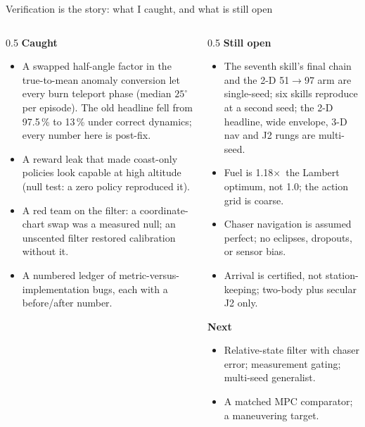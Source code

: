 \documentclass[aspectratio=169,11pt]{beamer}
\newcommand{\lambertRatio}{1.18\(\times\)}
\begin{document}
\begin{frame}{Verification is the story: what I caught, and what is still open}
\begin{columns}[T]
\begin{column}{0.5\textwidth}\footnotesize
\textbf{Caught}
\begin{itemize}
  \item A swapped half-angle factor in the true-to-mean anomaly conversion let every burn teleport phase (median $25^\circ$ per episode). The old headline fell from 97.5\,\% to 13\,\% under correct dynamics; every number here is post-fix.
  \item A reward leak that made coast-only policies look capable at high altitude (null test: a zero policy reproduced it).
  \item A red team on the filter: a coordinate-chart swap was a measured null; an unscented filter restored calibration without it.
  \item A numbered ledger of metric-versus-implementation bugs, each with a before/after number.
\end{itemize}
\end{column}
\begin{column}{0.5\textwidth}\footnotesize
\textbf{Still open}
\begin{itemize}
  \item The seventh skill's final chain and the 2-D 51$\to$97 arm are single-seed; six skills reproduce at a second seed; the 2-D headline, wide envelope, 3-D nav and J2 rungs are multi-seed.
  \item Fuel is \lambertRatio\ the Lambert optimum, not 1.0; the action grid is coarse.
  \item Chaser navigation is assumed perfect; no eclipses, dropouts, or sensor bias.
  \item Arrival is certified, not station-keeping; two-body plus secular J2 only.
\end{itemize}
\textbf{Next}
\begin{itemize}
  \item Relative-state filter with chaser error; measurement gating; multi-seed generalist.
  \item A matched MPC comparator; a maneuvering target.
\end{itemize}
\end{column}
\end{columns}
\end{frame}
\end{document}
